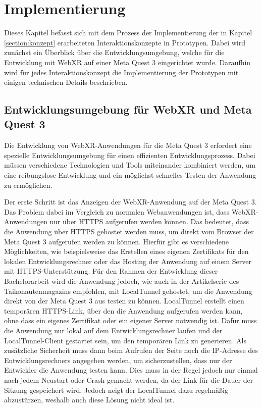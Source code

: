 \chapter{Implementierung}

Dieses Kapitel befasst sich mit dem Prozess der Implementierung der in Kapitel \ref{section:konzept} erarbeiteten Interaktionskonzepte in Prototypen.
Dabei wird zunächst ein Überblick über die Entwicklungsumgebung, welche für die Entwicklung mit WebXR auf einer Meta Quest 3 eingerichtet wurde.
Daraufhin wird für jedes Interaktionskonzept die Implementierung der Prototypen mit einigen technischen Details beschrieben.

\section{Entwicklungsumgebung für WebXR und Meta Quest 3}

Die Entwicklung von WebXR-Anwendungen für die Meta Quest 3 erfordert eine spezielle Entwicklungsumgebung für einen effizienten Entwicklungsprozess.
Dabei müssen verschiedene Technologien und Tools miteinander kombiniert werden, um eine reibungslose Entwicklung und ein möglichst schnelles Testen der Anwendung zu ermöglichen.

Der erste Schritt ist das Anzeigen der WebXR-Anwendung auf der Meta Quest 3.
Das Problem dabei im Vergleich zu \glqq{}normalen\grqq{} Webanwendungen ist, dass WebXR-Anwendungen nur über HTTPS aufgerufen werden können.
Das bedeutet, dass die Anwendung über HTTPS gehostet werden muss, um direkt vom Browser der Meta Quest 3 aufgerufen werden zu können.
Hierfür gibt es verschiedene Möglichkeiten, wie beispielsweise das Erstellen eines eigenen Zertifikats für den lokalen Entwicklungsrechner oder das Hosting der Anwendung auf einem Server mit HTTPS-Unterstützung.
Für den Rahmen der Entwicklung dieser Bachelorarbeit wird die Anwendung jedoch, wie auch in der Artikelserie des Taikonautenmagazins \autocite[Part 0/8]{taikonauten-magazine} empfohlen, mit LocalTunnel gehostet, um die Anwendung direkt von der Meta Quest 3 aus testen zu können.
LocalTunnel erstellt einen temporären HTTPS-Link, über den die Anwendung aufgerufen werden kann, ohne dass ein eigenes Zertifikat oder ein eigener Server notwendig ist.
Dafür muss die Anwendung nur lokal auf dem Entwicklungsrechner laufen und der LocalTunnel-Client gestartet sein, um den temporären Link zu generieren.
Als zusätzliche Sicherheit muss dann beim Aufrufen der Seite noch die IP-Adresse des Entwicklungsrechners angegeben werden, um sicherzustellen, dass nur der Entwickler die Anwendung testen kann.
Dies muss in der Regel jedoch nur einmal nach jedem Neustart oder Crash gemacht werden, da der Link für die Dauer der Sitzung gespeichert wird.
Jedoch neigt der LocalTunnel dazu regelmäßig abzustürzen, weshalb auch diese Lösung nicht ideal ist.


